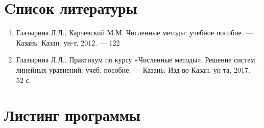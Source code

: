 \documentclass[a4paper,12pt]{article}
\begin{document}
	\section{Cписок литературы}
	\begin{enumerate}
		\item Глазырина Л.Л., Карчевский М.М. Численные методы: учебное пособие. — Казань: Казан.
		ун-т, 2012. — 122 
		\item Глазырина Л.Л.. Практикум по курсу «Численные методы». Решение
		систем линейных уравнений: учеб. пособие. — Казань: Изд-во Казан. ун-та, 2017. — 52 с.
	\end{enumerate}
	\clearpage
	\section{Листинг программы}
	
	
\end{document}
